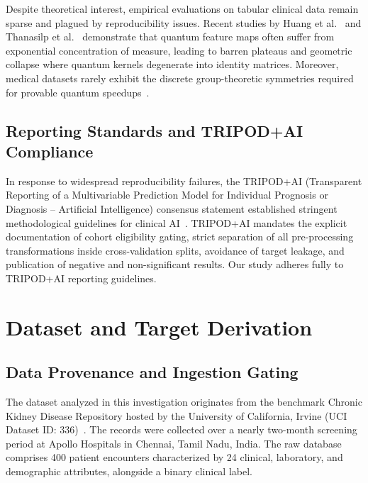 \documentclass[conference]{IEEEtran}
\begin{document}
Despite theoretical interest, empirical evaluations on tabular clinical data remain sparse and plagued by reproducibility issues. Recent studies by Huang et al.~\cite{huang2021power} and Thanasilp et al.~\cite{thanasilp2022exponential} demonstrate that quantum feature maps often suffer from exponential concentration of measure, leading to barren plateaus and geometric collapse where quantum kernels degenerate into identity matrices. Moreover, medical datasets rarely exhibit the discrete group-theoretic symmetries required for provable quantum speedups~\cite{preskill2018quantum}.

\subsection{Reporting Standards and TRIPOD+AI Compliance}
In response to widespread reproducibility failures, the TRIPOD+AI (Transparent Reporting of a Multivariable Prediction Model for Individual Prognosis or Diagnosis -- Artificial Intelligence) consensus statement established stringent methodological guidelines for clinical AI~\cite{collins2024tripod}. TRIPOD+AI mandates the explicit documentation of cohort eligibility gating, strict separation of all pre-processing transformations inside cross-validation splits, avoidance of target leakage, and publication of negative and non-significant results. Our study adheres fully to TRIPOD+AI reporting guidelines.

\section{Dataset and Target Derivation}

\subsection{Data Provenance and Ingestion Gating}
The dataset analyzed in this investigation originates from the benchmark Chronic Kidney Disease Repository hosted by the University of California, Irvine (UCI Dataset ID: 336)~\cite{misc_chronic_kidney_disease_336}. The records were collected over a nearly two-month screening period at Apollo Hospitals in Chennai, Tamil Nadu, India. The raw database comprises 400 patient encounters characterized by 24 clinical, laboratory, and demographic attributes, alongside a binary clinical label.
\end{document}
